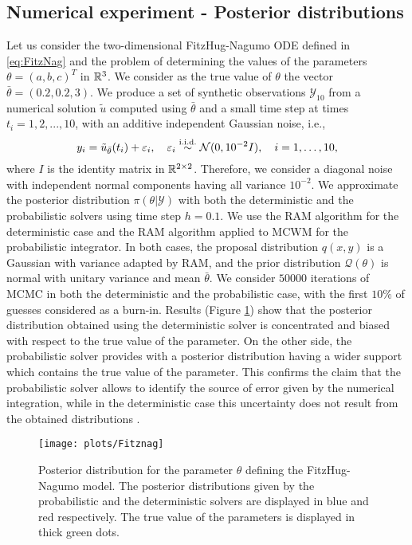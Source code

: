 \subsection{Numerical experiment - Posterior distributions}
Let us consider the two-dimensional FitzHug-Nagumo ODE defined in \eqref{eq:FitzNag} and the problem of determining the values of the parameters $\theta = (a, b, c)^T$ in $\mathbb{R}^3$. We consider as the true value of $\theta$ the vector $\bar \theta = (0.2, 0.2, 3)$. We produce a set of synthetic observations $\mathcal{Y}_{10}$ from a numerical solution $\tilde u$ computed using $\bar \theta$ and a small time step at times $t_i = 1, 2, ..., 10$, with an additive independent Gaussian noise, i.e.,
\begin{equation}
	y_i = \tilde u_{\bar\theta}(t_i) + \varepsilon_i, \quad \varepsilon_i \stackrel{\text{i.i.d.}}{\sim} \mathcal N (0, 10^{-2}I), \quad i = 1, \ldots, 10,
\end{equation}
where $I$ is the identity matrix in $\mathbb{R}^{2\times2}$. Therefore, we consider a diagonal noise with independent normal components having all variance $10^{-2}$. We approximate the posterior distribution $\pi(\theta|\mathcal Y)$ with both the deterministic and the probabilistic solvers using time step $h = 0.1$. We use the RAM algorithm for the deterministic case and the RAM algorithm applied to MCWM for the probabilistic integrator. In both cases, the proposal distribution $q(x,y)$ is a Gaussian with variance adapted by RAM, and the prior distribution $\mathcal{Q}(\theta)$ is normal with unitary variance and mean $\bar \theta$. We consider $50000$ iterations of MCMC in both the deterministic and the probabilistic case, with the first $10\%$ of guesses considered as a burn-in. Results (Figure \ref{fig:MCMC_FHN}) show that the posterior distribution obtained using the deterministic solver is concentrated and biased with respect to the true value of the parameter. On the other side, the probabilistic solver provides with a posterior distribution having a wider support which contains the true value of the parameter. This confirms the claim that the probabilistic solver allows to identify the source of error given by the numerical integration, while in the deterministic case this uncertainty does not result from the obtained distributions \cite{CGS16}.

\begin{figure}
	\centering
	\texttt{[image: plots/Fitznag]}
	\caption{Posterior distribution for the parameter $\theta$ defining the FitzHug-Nagumo model. The posterior distributions given by the probabilistic and the deterministic solvers are displayed in blue and red respectively. The true value of the parameters is displayed in thick green dots.}
	\label{fig:MCMC_FHN}
\end{figure}